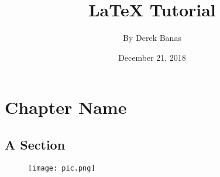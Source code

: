 \documentclass[a4paper,12pt]{book}
\begin{document}
\title{\Large{\textbf{LaTeX Tutorial}}}
\author{By Derek Banas}
\date{December 21, 2018}
\maketitle
\let\cleardoublepage\clearpage
\tableofcontents

\pagestyle{fancy}
\fancyhf{}

\renewcommand{\headrulewidth}{2pt}
\renewcommand{\footrulewidth}{1pt}

\fancyhead[LE]{\leftmark}

\fancyhead[RO]{\nouppercase{\rightmark}}

\fancyfoot[LE,RO]{\thepage}

\chapter{Chapter Name}
\blindtext
\section{A Section}

\blindmathtrue

\enlargethispage{\baselineskip}

\blindtext[2]

\blinditemize
\blindenumerate
\blinddescription


\newpage

\blindtext

\begin{figure}[ht]
\centering

\texttt{[image: pic.png]}
\end{figure}
\blindtext
\end{document}
